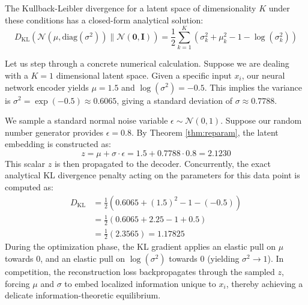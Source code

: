 The Kullback-Leibler divergence for a latent space of dimensionality $K$ under these conditions has a closed-form analytical solution:
\begin{equation}
    D_{\text{KL}}(\mathcal{N}(\mu, \text{diag}(\sigma^2)) \parallel \mathcal{N}(\mathbf{0}, \mathbf{I})) = \frac{1}{2} \sum_{k=1}^K \left( \sigma_k^2 + \mu_k^2 - 1 - \log(\sigma_k^2) \right)
\end{equation}

Let us step through a concrete numerical calculation. Suppose we are dealing with a $K=1$ dimensional latent space. Given a specific input $x_i$, our neural network encoder yields $\mu = 1.5$ and $\log(\sigma^2) = -0.5$.
This implies the variance is $\sigma^2 = \exp(-0.5) \approx 0.6065$, giving a standard deviation of $\sigma \approx 0.7788$.

We sample a standard normal noise variable $\epsilon \sim \mathcal{N}(0, 1)$. Suppose our random number generator provides $\epsilon = 0.8$. By Theorem \ref{thm:reparam}, the latent embedding is constructed as:
\begin{equation}
    z = \mu + \sigma \cdot \epsilon = 1.5 + 0.7788 \cdot 0.8 = 2.1230
\end{equation}
This scalar $z$ is then propagated to the decoder. Concurrently, the exact analytical KL divergence penalty acting on the parameters for this data point is computed as:
\begin{align}
    D_{\text{KL}} &= \frac{1}{2} \left( 0.6065 + (1.5)^2 - 1 - (-0.5) \right) \\
    &= \frac{1}{2} \left( 0.6065 + 2.25 - 1 + 0.5 \right) \\
    &= \frac{1}{2} \left( 2.3565 \right) = 1.17825
\end{align}
During the optimization phase, the KL gradient applies an elastic pull on $\mu$ towards $0$, and an elastic pull on $\log(\sigma^2)$ towards $0$ (yielding $\sigma^2 \to 1$). In competition, the reconstruction loss backpropagates through the sampled $z$, forcing $\mu$ and $\sigma$ to embed localized information unique to $x_i$, thereby achieving a delicate information-theoretic equilibrium.

